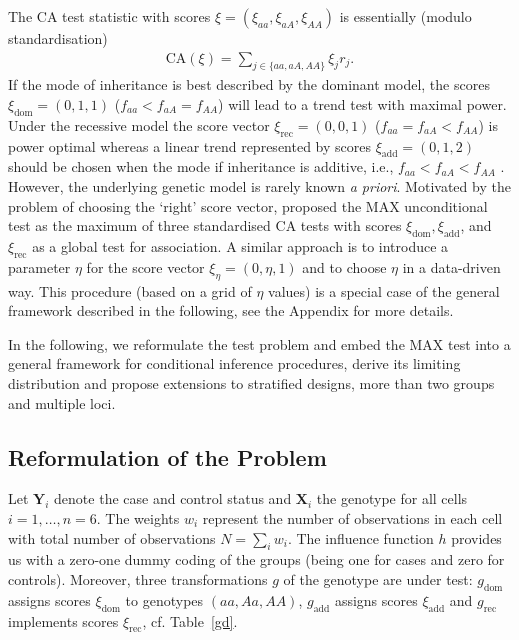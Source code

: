 \documentclass[bimj,fleqn]{w-art}
\newcommand{\X}{\mathbf{X}}
\newcommand{\Y}{\mathbf{Y}}
\begin{document}
The CA test statistic with scores 
$\mathbb{\xi} = (\xi_{aa}, \xi_{aA}, \xi_{AA})$ 
is essentially (modulo standardisation)
\begin{eqnarray} \label{CAstat}
\text{CA}(\mathbb{\xi}) = \sum_{j \in \{aa, aA, AA\}} \xi_j r_j.
\end{eqnarray}
If the mode of inheritance is best described by the dominant model,
the scores $\mathbb{\xi}_\text{dom}=(0,1,1)$ 
($f_{aa} < f_{aA} = f_{AA}$) will lead to a trend test with maximal power.
Under the recessive model the score vector 
$\mathbb{\xi}_\text{rec}=(0,0,1)$ ($f_{aa} =  f_{aA} < f_{AA}$)
is power optimal whereas a linear trend represented
by scores $\mathbb{\xi}_\text{add}=(0,1,2)$ should be chosen
when the mode if inheritance is additive, i.e., $f_{aa} < f_{aA} < f_{AA}$ 
\citep{Sasieni:1997,Slager:2001}. 
However, the underlying genetic model is rarely known \textit{a priori}. 
Motivated by the problem of choosing the `right' score vector, 
\citet{Freidlin:2002} proposed the MAX unconditional test as the maximum of three standardised 
CA tests with scores 
$\mathbb{\xi}_\text{dom}, \mathbb{\xi}_\text{add}$, and $\mathbb{\xi}_\text{rec}$
as a global test for association. A similar approach \citep{Zheng:2003,Zheng:2008}
is to introduce a parameter $\eta$ for the score vector 
$\mathbb{\xi}_\eta=(0,\eta,1)$ and to choose $\eta$ in a data-driven way.
This procedure (based on a grid of $\eta$ values) is a special 
case of the general framework described in the following, see the Appendix for more details.

In the following, we reformulate the test problem and embed the MAX test into a general framework
for conditional inference procedures, derive its limiting 
distribution and propose extensions to stratified designs, 
more than two groups and multiple loci.

\subsection{Reformulation of the Problem}
Let $\Y_i$ denote the case and control status and $\X_i$ the genotype
for all cells $i = 1, \dots, n = 6$. The weights $w_i$ represent the number of 
observations in each cell with total number of observations $N = \sum_i w_i$.
The influence function $h$ provides us with a zero-one 
dummy coding of the groups (being one for cases and zero for controls).
Moreover, three transformations $g$ of the genotype are under test: $g_\text{dom}$ 
assigns scores $\xi_\text{dom}$ to
genotypes $(aa, Aa, AA)$, $g_\text{add}$ assigns scores 
$\xi_\text{add}$ and $g_\text{rec}$
implements scores $\xi_\text{rec}$, cf. Table~\ref{gd}.
\end{document}
